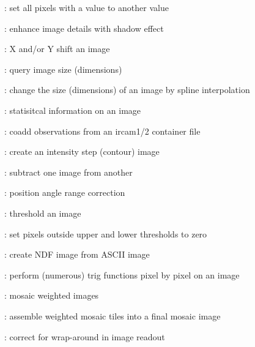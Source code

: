 \begin{description}
\begin{description}
\item []: set all pixels with a value to another value

\item []: enhance image details with shadow effect

\item []: X and/or Y shift an image

\item []: query image size (dimensions)

\item []: change the size (dimensions) of an
image by spline interpolation

\item []: statisitcal information on an image

\item []: coadd observations from an {\sc
ircam1/2} container file

\item []: create an intensity step (contour) image

\item []: subtract one image from another

\item []: position angle range correction

\item []: threshold an image

\item []: set pixels outside upper and lower
thresholds to zero

\item []: create NDF image from ASCII image

\item []: perform (numerous) trig functions pixel
by pixel on an image

\item []: mosaic weighted images

\item []: assemble weighted mosaic tiles into a
final mosaic image

\item []: correct for wrap-around in image readout


\end{description}
\end{description}
